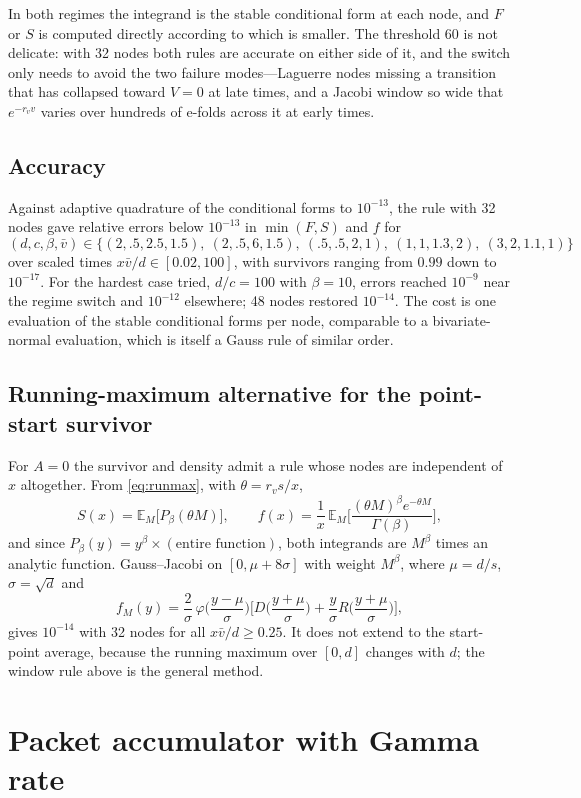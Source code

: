 \documentclass[11pt]{article}
\newcommand{\E}{\mathbb{E}}
\begin{document}
In both regimes the integrand is the stable conditional form at each node, and $F$ or $S$ is computed directly according to which is smaller. The threshold $60$ is not delicate: with 32 nodes both rules are accurate on either side of it, and the switch only needs to avoid the two failure modes---Laguerre nodes missing a transition that has collapsed toward $V=0$ at late times, and a Jacobi window so wide that $e^{-r_vv}$ varies over hundreds of e-folds across it at early times.

\subsection{Accuracy}
Against adaptive quadrature of the conditional forms to $10^{-13}$, the rule with 32 nodes gave relative errors below $10^{-13}$ in $\min(F,S)$ and $f$ for
\[
(d,c,\beta,\bar v)\in\{(2,.5,2.5,1.5),\ (2,.5,6,1.5),\ (.5,.5,2,1),\ (1,1,1.3,2),\ (3,2,1.1,1)\}
\]
over scaled times $x\bar v/d\in[0.02,100]$, with survivors ranging from $0.99$ down to $10^{-17}$. For the hardest case tried, $d/c=100$ with $\beta=10$, errors reached $10^{-9}$ near the regime switch and $10^{-12}$ elsewhere; 48 nodes restored $10^{-14}$. The cost is one evaluation of the stable conditional forms per node, comparable to a bivariate-normal evaluation, which is itself a Gauss rule of similar order.

\subsection{Running-maximum alternative for the point-start survivor}
For $A=0$ the survivor and density admit a rule whose nodes are independent of $x$ altogether. From \eqref{eq:runmax}, with $\theta=r_vs/x$,
\[
S(x)=\E_M\big[P_\beta(\theta M)\big],\qquad f(x)=\frac{1}{x}\,\E_M\Big[\frac{(\theta M)^{\beta}e^{-\theta M}}{\Gamma(\beta)}\Big],
\]
and since $P_\beta(y)=y^{\beta}\times(\text{entire function})$, both integrands are $M^{\beta}$ times an analytic function. Gauss--Jacobi on $[0,\mu+8\sigma]$ with weight $M^{\beta}$, where $\mu=d/s$, $\sigma=\sqrt d$ and
\[
f_M(y)=\frac{2}{\sigma}\,\varphi\!\Big(\frac{y-\mu}{\sigma}\Big)\Big[D\!\Big(\frac{y+\mu}{\sigma}\Big)+\frac{y}{\sigma}R\!\Big(\frac{y+\mu}{\sigma}\Big)\Big],
\]
gives $10^{-14}$ with 32 nodes for all $x\bar v/d\ge0.25$. It does not extend to the start-point average, because the running maximum over $[0,d]$ changes with $d$; the window rule above is the general method.

\section{Packet accumulator with Gamma rate}
\end{document}
